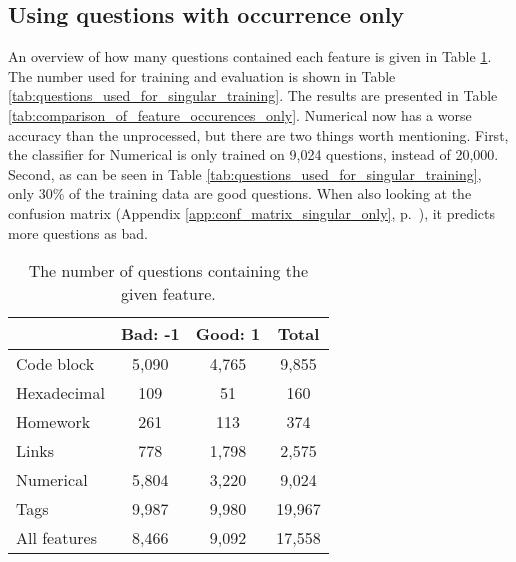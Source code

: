\subsection{Using questions with occurrence only}
\label{sec:comparison_feature_occurence_unprocessed}
An overview of how many questions contained each feature is given in Table \ref{tab:amount_of_singular_questions_processed}.
The number used for training and evaluation is shown in Table \ref{tab:questions_used_for_singular_training}.
The results are presented in Table \ref{tab:comparison_of_feature_occurences_only}.
Numerical now has a worse accuracy than the unprocessed, but there are two things worth mentioning. 
First, the classifier for Numerical is only trained on 9,024 questions, instead of 20,000.
Second, as can be seen in Table \ref{tab:questions_used_for_singular_training}, only 30\% of the training data are good questions. 
When also looking at the confusion matrix (Appendix \ref{app:conf_matrix_singular_only}, p.~\pageref{app:conf_matrix_singular_only}), it predicts more questions as bad.
\begin{table}[!h]%
	\centering
	\begin{tabular}{| l | c | c | c |}
		\hline
		~ 					& Bad: -1			& Good: 1		& Total		\\ \hline
		Code block			& 5,090				& 4,765			& 9,855		\\ \hline
		Hexadecimal			& 109				& 51			& 160		\\ \hline
		Homework			& 261				& 113			& 374		\\ \hline
		Links				& 778				& 1,798			& 2,575		\\ \hline
		Numerical			& 5,804				& 3,220			& 9,024		\\ \hline
		Tags				& 9,987				& 9,980			& 19,967	\\ \hline
		All features		& 8,466				& 9,092			& 17,558	\\ \hline
	\end{tabular}
	\caption{The number of questions containing the given feature.}
	\label{tab:amount_of_singular_questions_processed}
\end{table}
